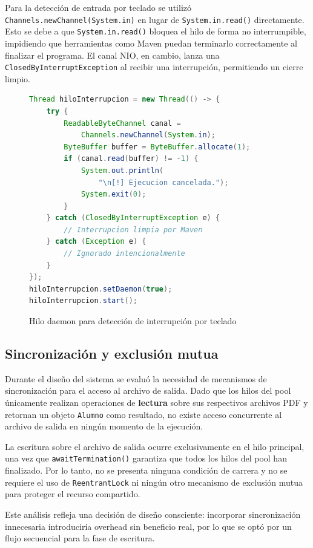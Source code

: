 Para la detección de entrada por teclado se utilizó \texttt{Channels.newChannel(System.in)} en lugar de \texttt{System.in.read()} directamente. Esto se debe a que \texttt{System.in.read()} bloquea el hilo de forma no interrumpible, impidiendo que herramientas como Maven puedan terminarlo correctamente al finalizar el programa. El canal NIO, en cambio, lanza una \texttt{ClosedByInterruptException} al recibir una interrupción, permitiendo un cierre limpio.
\vspace{-0.2cm}
\begin{figure}[H]
    \centering
    \caption{Hilo daemon para detección de interrupción por teclado}
    \label{code:hilo_daemon}
    \vspace{-0.2cm}
    \begin{lstlisting}[language=Java]
Thread hiloInterrupcion = new Thread(() -> {
    try {
        ReadableByteChannel canal =
            Channels.newChannel(System.in);
        ByteBuffer buffer = ByteBuffer.allocate(1);
        if (canal.read(buffer) != -1) {
            System.out.println(
                "\n[!] Ejecucion cancelada.");
            System.exit(0);
        }
    } catch (ClosedByInterruptException e) {
        // Interrupcion limpia por Maven
    } catch (Exception e) {
        // Ignorado intencionalmente
    }
});
hiloInterrupcion.setDaemon(true);
hiloInterrupcion.start();
    \end{lstlisting}
\end{figure}

\subsection*{Sincronización y exclusión mutua}

Durante el diseño del sistema se evaluó la necesidad de mecanismos de sincronización para el acceso al archivo de salida. Dado que los hilos del pool únicamente realizan operaciones de \textbf{lectura} sobre sus respectivos archivos PDF y retornan un objeto \texttt{Alumno} como resultado, no existe acceso concurrente al archivo de salida en ningún momento de la ejecución.

La escritura sobre el archivo de salida ocurre exclusivamente en el hilo principal, una vez que \texttt{awaitTermination()} garantiza que todos los hilos del pool han finalizado. Por lo tanto, no se presenta ninguna condición de carrera y no se requiere el uso de \texttt{ReentrantLock} ni ningún otro mecanismo de exclusión mutua para proteger el recurso compartido.

Este análisis refleja una decisión de diseño consciente: incorporar sincronización innecesaria introduciría overhead sin beneficio real, por lo que se optó por un flujo secuencial para la fase de escritura.
